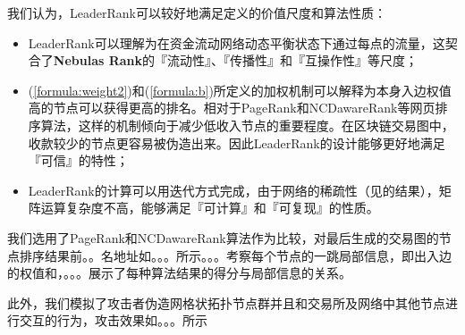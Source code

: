 我们认为，LeaderRank可以较好地满足定义的价值尺度和算法性质：
\begin{itemize}
	\item LeaderRank可以理解为在资金流动网络动态平衡状态下通过每点的流量，这契合了\textbf{Nebulas Rank}的『流动性』、『传播性』和『互操作性』等尺度；
	\item (\ref{formula:weight2})和(\ref{formula:b})所定义的加权机制可以解释为本身入边权值高的节点可以获得更高的排名。相对于PageRank和NCDawareRank\cite{Nikolakopoulos2013}等网页排序算法，这样的机制倾向于减少低收入节点的重要程度。在区块链交易图中，收款较少的节点更容易被伪造出来。因此LeaderRank的设计能够更好地满足『可信』的特性；
	\item LeaderRank的计算可以用迭代方式完成，由于网络的稀疏性（见的结果），矩阵运算复杂度不高，能够满足『可计算』和『可复现』的性质。
\end{itemize}

我们选用了PageRank和NCDawareRank算法作为比较，对最后生成的交易图的节点排序结果前。。名地址如。。。所示。。。考察每个节点的一跳局部信息，即出入边的权值和，。。。展示了每种算法结果的得分与局部信息的关系。

此外，我们模拟了攻击者伪造网格状拓扑节点群并且和交易所及网络中其他节点进行交互的行为，攻击效果如。。。所示
